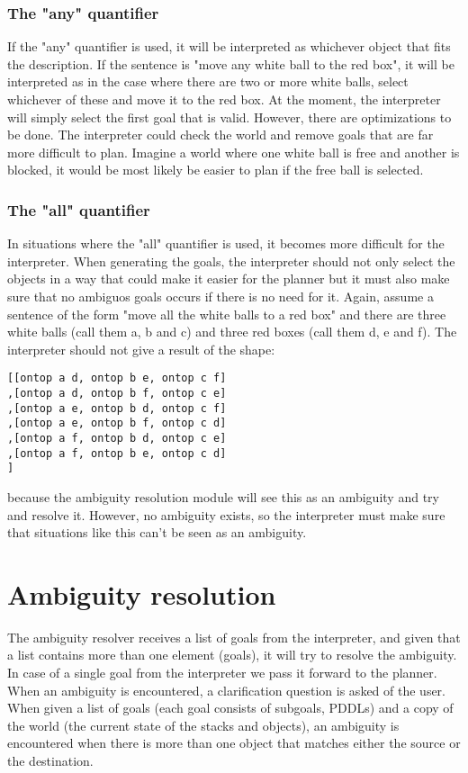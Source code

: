 \documentclass[11pt]{article}
\begin{document}
\subsubsection{The "any" quantifier}
If the "any" quantifier is used, it will be interpreted as whichever object that fits the description. If the sentence is "move any white ball to the red box", it will be interpreted as in the case where there are two or more white balls, select whichever of these and move it to the red box. At the moment, the interpreter will simply select the first goal that is valid. However, there are optimizations to be done. The interpreter could check the world and remove goals that are far more difficult to plan. Imagine a world where one white ball is free and another is blocked, it would be most likely be easier to plan if the free ball is selected.

\subsubsection{The "all" quantifier}
In situations where the "all" quantifier is used, it becomes more difficult for the interpreter. When generating the goals, the interpreter should not only select the objects in a way that could make it easier for the planner but it must also make sure that no ambiguos goals occurs if there is no need for it. Again, assume a sentence of the form "move all the white balls to a red box" and there are three white balls (call them a, b and c) and three red boxes (call them d, e and f). The interpreter should not give a result of the shape:
\begin{verbatim}
[[ontop a d, ontop b e, ontop c f]
,[ontop a d, ontop b f, ontop c e]
,[ontop a e, ontop b d, ontop c f]
,[ontop a e, ontop b f, ontop c d]
,[ontop a f, ontop b d, ontop c e]
,[ontop a f, ontop b e, ontop c d]
]
\end{verbatim}
because the ambiguity resolution module will see this as an ambiguity and try and resolve it. However, no ambiguity exists, so the interpreter must make sure that situations like this can't be seen as an ambiguity.

\section*{Ambiguity resolution}
The ambiguity resolver receives a list of goals from the interpreter, and given that a list contains more than one element (goals), it will try to resolve the ambiguity. In case of a single goal from the interpreter we pass it forward to the planner. When an ambiguity is encountered, a clarification question is asked of the user.
When given a list of goals (each goal consists of subgoals, PDDLs) and a copy of the world (the current state of the stacks and objects), an ambiguity is encountered when there is more than one object that matches either the source or the destination.
\end{document}
